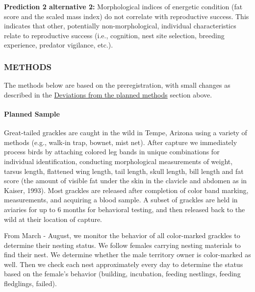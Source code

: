 \documentclass[
]{article}
\begin{document}
\textbf{Prediction 2 alternative 2:} Morphological indices of energetic
condition (fat score and the scaled mass index) do not correlate with
reproductive success. This indicates that other, potentially
non-morphological, individual characteristics relate to reproductive
success (i.e., cognition, nest site selection, breeding experience,
predator vigilance, etc.).

\hypertarget{methods-1}{%
\subsubsection{METHODS}\label{methods-1}}

The methods below are based on the preregistration, with small changes
as described in the
\protect\hyperlink{associated-preregistration}{Deviations from the
planned methods} section above.

\hypertarget{planned-sample}{%
\paragraph{\texorpdfstring{\textbf{Planned
Sample}}{Planned Sample}}\label{planned-sample}}

Great-tailed grackles are caught in the wild in Tempe, Arizona using a
variety of methods (e.g., walk-in trap, bownet, mist net). After capture
we immediately process birds by attaching colored leg bands in unique
combinations for individual identification, conducting morphological
measurements of weight, tarsus length, flattened wing length, tail
length, skull length, bill length and fat score (the amount of visible
fat under the skin in the clavicle and abdomen as in Kaiser, 1993). Most
grackles are released after completion of color band marking,
measurements, and acquiring a blood sample. A subset of grackles are
held in aviaries for up to 6 months for behavioral testing, and then
released back to the wild at their location of capture.

From March - August, we monitor the behavior of all color-marked
grackles to determine their nesting status. We follow females carrying
nesting materials to find their nest. We determine whether the male
territory owner is color-marked as well. Then we check each nest
approximately every day to determine the status based on the female's
behavior (building, incubation, feeding nestlings, feeding fledglings,
failed).
\end{document}
